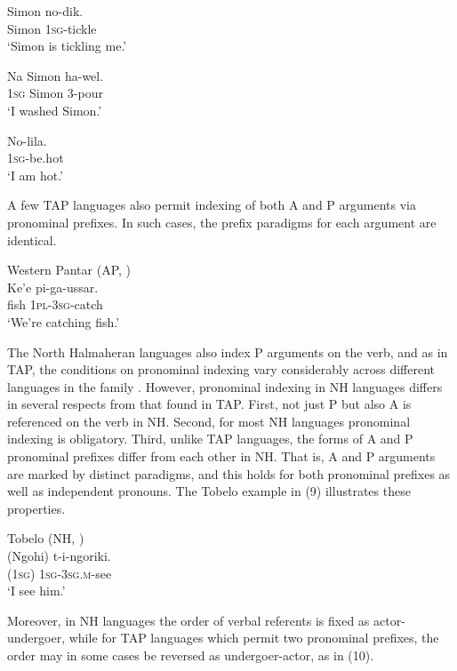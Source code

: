 \ea%
\gll  Simon no-dik. \\
  Simon \textsc{1sg}-tickle  \\
\glt `Simon is tickling me.'
\z





\ea%
\gll  Na Simon ha-wel. \\
  \textsc{1sg} Simon 3-pour  \\
\glt `I washed Simon.'
\z





\ea%
\gll  No-lila. \\
  \textsc{1sg}-be.hot  \\
\glt `I am hot.'
\z





A few TAP languages also permit indexing of both A and P arguments via pronominal prefixes. In such cases, the prefix paradigms for each argument are identical.

\ea%
Western Pantar (AP, \citet{Holton2010})\\
\gll  Ke'e pi-ga-ussar. \\
   fish \textsc{1pl-3sg}-catch \\
\glt `We're catching fish.'
\z





The North Halmaheran languages also index P arguments on the verb, and as in TAP, the conditions on pronominal indexing vary considerably across different languages in the family \citep{Holton2008}. However, pronominal indexing in NH languages differs in several respects from that found in TAP. First, not just P but also A is referenced on the verb in NH. Second, for most NH languages pronominal indexing is obligatory. Third, unlike TAP languages, the forms of A and P pronominal prefixes differ from each other in NH. That is, A and P arguments are marked by distinct paradigms, and this holds for both pronominal prefixes as well as independent pronouns. The Tobelo example in (9) illustrates these properties.

\ea%
Tobelo (NH, \citet{Holton2003})\\
\gll  (Ngohi) t-i-ngoriki. \\
    (\textsc{1sg}) \textsc{1sg-3sg.m}-see\\
\glt `I see him.'
\z





Moreover, in NH languages the order of verbal referents is fixed as actor-undergoer, while for TAP languages which permit two pronominal prefixes, the order may in some cases be reversed as undergoer-actor, as in (10).

